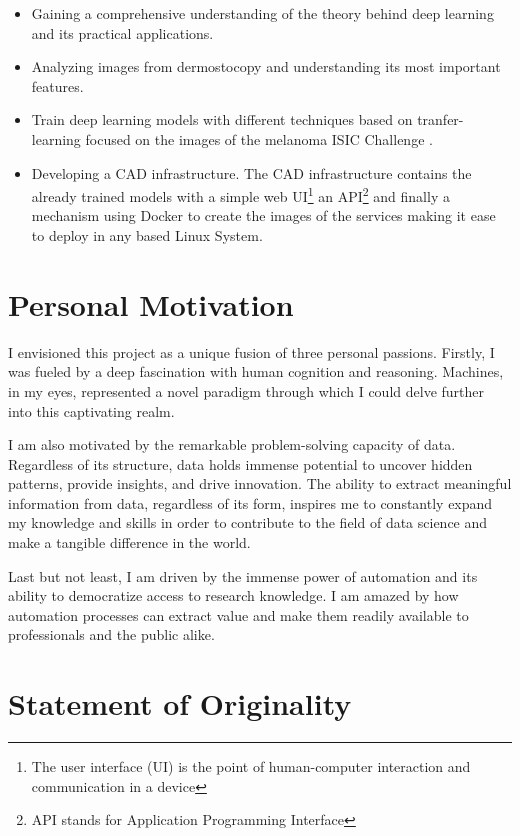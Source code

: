 \begin{itemize}
  \item Gaining a comprehensive understanding of the theory behind deep learning and its practical applications.
  \item Analyzing images from dermostocopy and understanding its most important features.
  \item Train deep learning models with different techniques based on tranfer-learning focused on the images of the melanoma ISIC Challenge \cite{IsicChallenge}.
  \item Developing a CAD infrastructure. The CAD infrastructure contains the
    already trained models with a simple web UI\footnote{The user interface
    (UI) is the point of human-computer interaction and communication in a
    device} an API\footnote{API stands for Application Programming Interface}
    and finally a mechanism using Docker to create the images of the services
    making it ease to deploy in any based Linux System.
\end{itemize}

\section{Personal Motivation}

I envisioned this project as a unique fusion of three personal passions.
Firstly, I was fueled by a deep fascination with human cognition and reasoning.
Machines, in my eyes, represented a novel paradigm through which I could delve
further into this captivating realm. \newline

I am also motivated by the remarkable problem-solving capacity of data.
Regardless of its structure, data holds immense potential to uncover hidden
patterns, provide insights, and drive innovation. The ability to extract
meaningful information from data, regardless of its form, inspires me to
constantly expand my knowledge and skills in order to contribute to the field
of data science and make a tangible difference in the world. \newline

Last but not least, I am driven by the immense power of automation and its
ability to democratize access to research knowledge. I am amazed by how
automation processes can extract value and make them readily available to
professionals and the public alike.

\section{Statement of Originality}


